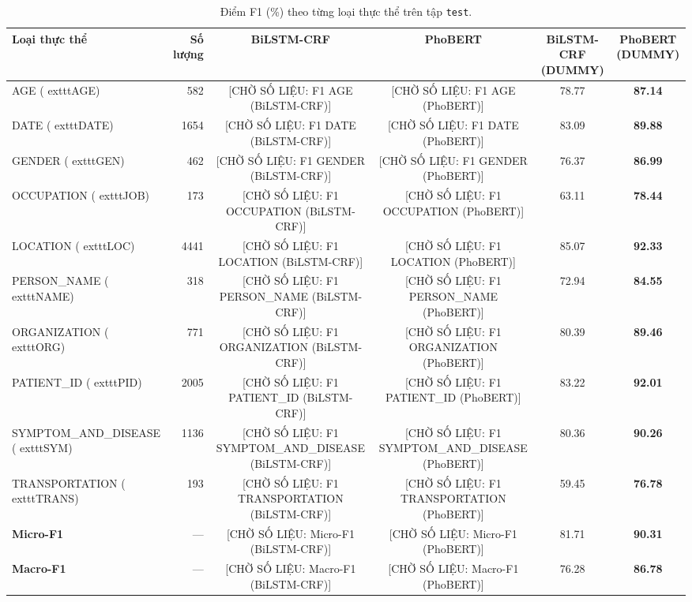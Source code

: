 \begin{table}[t]
\centering
\small
\begin{tabular}{lrcccc}
\hline
\textbf{Loại thực thể} & \textbf{Số lượng} & \textbf{BiLSTM-CRF} & \textbf{PhoBERT} & \textbf{BiLSTM-CRF (DUMMY)} & \textbf{PhoBERT (DUMMY)} \\
\hline
AGE (	exttt{AGE}) & 582 & [CHỜ SỐ LIỆU: F1 AGE (BiLSTM-CRF)] & [CHỜ SỐ LIỆU: F1 AGE (PhoBERT)] & 78.77 & \textbf{87.14} \\
DATE (	exttt{DATE}) & 1654 & [CHỜ SỐ LIỆU: F1 DATE (BiLSTM-CRF)] & [CHỜ SỐ LIỆU: F1 DATE (PhoBERT)] & 83.09 & \textbf{89.88} \\
GENDER (	exttt{GEN}) & 462 & [CHỜ SỐ LIỆU: F1 GENDER (BiLSTM-CRF)] & [CHỜ SỐ LIỆU: F1 GENDER (PhoBERT)] & 76.37 & \textbf{86.99} \\
OCCUPATION (	exttt{JOB}) & 173 & [CHỜ SỐ LIỆU: F1 OCCUPATION (BiLSTM-CRF)] & [CHỜ SỐ LIỆU: F1 OCCUPATION (PhoBERT)] & 63.11 & \textbf{78.44} \\
LOCATION (	exttt{LOC}) & 4441 & [CHỜ SỐ LIỆU: F1 LOCATION (BiLSTM-CRF)] & [CHỜ SỐ LIỆU: F1 LOCATION (PhoBERT)] & 85.07 & \textbf{92.33} \\
PERSON\_NAME (	exttt{NAME}) & 318 & [CHỜ SỐ LIỆU: F1 PERSON\_NAME (BiLSTM-CRF)] & [CHỜ SỐ LIỆU: F1 PERSON\_NAME (PhoBERT)] & 72.94 & \textbf{84.55} \\
ORGANIZATION (	exttt{ORG}) & 771 & [CHỜ SỐ LIỆU: F1 ORGANIZATION (BiLSTM-CRF)] & [CHỜ SỐ LIỆU: F1 ORGANIZATION (PhoBERT)] & 80.39 & \textbf{89.46} \\
PATIENT\_ID (	exttt{PID}) & 2005 & [CHỜ SỐ LIỆU: F1 PATIENT\_ID (BiLSTM-CRF)] & [CHỜ SỐ LIỆU: F1 PATIENT\_ID (PhoBERT)] & 83.22 & \textbf{92.01} \\
SYMPTOM\_AND\_DISEASE (	exttt{SYM}) & 1136 & [CHỜ SỐ LIỆU: F1 SYMPTOM\_AND\_DISEASE (BiLSTM-CRF)] & [CHỜ SỐ LIỆU: F1 SYMPTOM\_AND\_DISEASE (PhoBERT)] & 80.36 & \textbf{90.26} \\
TRANSPORTATION (	exttt{TRANS}) & 193 & [CHỜ SỐ LIỆU: F1 TRANSPORTATION (BiLSTM-CRF)] & [CHỜ SỐ LIỆU: F1 TRANSPORTATION (PhoBERT)] & 59.45 & \textbf{76.78} \\
\hline
\textbf{Micro-F1} & — & [CHỜ SỐ LIỆU: Micro-F1 (BiLSTM-CRF)] & [CHỜ SỐ LIỆU: Micro-F1 (PhoBERT)] & 81.71 & \textbf{90.31} \\
\textbf{Macro-F1} & — & [CHỜ SỐ LIỆU: Macro-F1 (BiLSTM-CRF)] & [CHỜ SỐ LIỆU: Macro-F1 (PhoBERT)] & 76.28 & \textbf{86.78} \\
\hline
\end{tabular}
\caption{Điểm F1 (\%) theo từng loại thực thể trên tập \texttt{test}.}
\label{tab:per_entity_f1}
\end{table}
